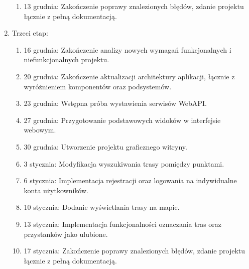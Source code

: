 \documentclass[10pt,a4paper]{article}
\begin{document}
\begin{enumerate}
\begin{enumerate}
		\item 13 grudnia: Zakończenie poprawy znalezionych błędów, zdanie projektu łącznie z pełną dokumentacją.
	\end{enumerate}
	\item Trzeci etap:
	\begin{enumerate}
		\mdseries
		\item 16 grudnia: Zakończenie analizy nowych wymagań funkcjonalnych i niefunkcjonalnych projektu.
		\item 20 grudnia: Zakończenie aktualizacji architektury aplikacji, łącznie z wyróżnieniem komponentów oraz podsystemów.
		\item 23 grudnia: Wstępna próba wystawienia serwisów WebAPI.
		\item 27 grudnia: Przygotowanie podstawowych widoków w interfejsie webowym.
		\item 30 grudnia: Utworzenie projektu graficznego witryny.
		\item 3 stycznia: Modyfikacja wyszukiwania trasy pomiędzy punktami.
		\item 6 stycznia: Implementacja rejestracji oraz logowania na indywidualne konta użytkowników.
		\item 10 stycznia: Dodanie wyświetlania trasy na mapie.
		\item 13 stycznia: Implementacja funkcjonalności oznaczania tras oraz przystanków jako ulubione.
		\item 17 stycznia: Zakończenie poprawy znalezionych błędów, zdanie projektu łącznie z pełną dokumentacją.
	\end{enumerate}
\end{enumerate}
\end{document}
